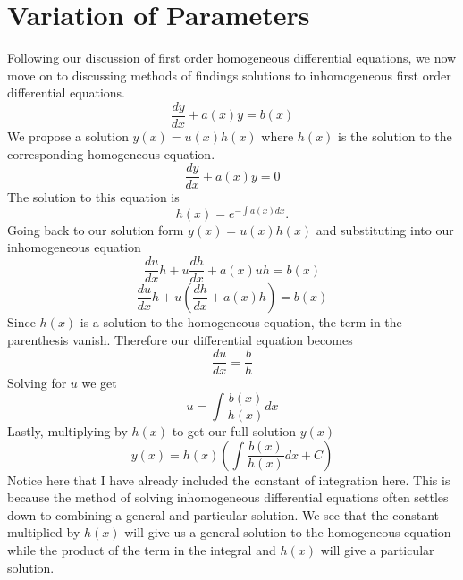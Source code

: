 \section{Variation of Parameters}
Following our discussion of first order homogeneous differential equations, we now move on to discussing methods of findings solutions to inhomogeneous first order differential equations.
\[\frac{dy}{dx} + a(x)y = b(x)\]
We propose a solution $y(x) = u(x)h(x)$ where $h(x)$ is the solution to the corresponding homogeneous equation.
\[\frac{dy}{dx} +a(x)y = 0\]
The solution to this equation is
\[h(x) = e^{-\int a(x)dx}.\]
Going back to our solution form $y(x) = u(x)h(x)$ and substituting into our inhomogeneous equation
\[\frac{du}{dx}h + u\frac{dh}{dx} + a(x)uh = b(x)\]
\[\frac{du}{dx}h + u\left( \frac{dh}{dx} + a(x)h \right) = b(x)\]
Since $h(x)$ is a solution to the homogeneous equation, the term in the parenthesis vanish. Therefore our differential equation becomes
\[\frac{du}{dx} = \frac{b}{h}\]
Solving for $u$ we get
\[u = \int \frac{b(x)}{h(x)}dx\]
Lastly, multiplying by $h(x)$ to get our full solution $y(x)$
\[y(x) = h(x)\left(\int \frac{b(x)}{h(x)}dx + C\right)\]
Notice here that I have already included the constant of integration here. 
This is because the method of solving inhomogeneous differential equations often settles down to combining a general and particular solution. 
We see that the constant multiplied by $h(x)$ will give us a general solution to the homogeneous equation while the product of the term in the integral and $h(x)$ will give a particular solution. 
